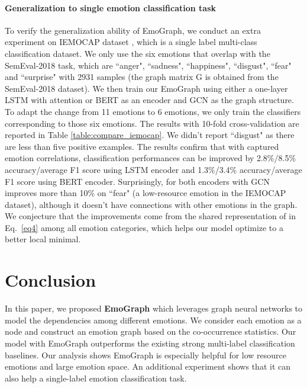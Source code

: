 \documentclass[11pt,a4paper]{article}
\begin{document}
\paragraph{Generalization to single emotion classification task}
To verify the generalization ability of EmoGraph, we conduct an extra experiment on IEMOCAP dataset \cite{busso2008iemocap}, which is a single label multi-class classification dataset. We only use the six emotions that overlap with the SemEval-2018 task, which are ``anger", ``sadness", ``happiness", ``disgust", ``fear" and ``surprise" with 2931 samples (the graph matrix G is obtained from the SemEval-2018 dataset). We then train our EmoGraph using either a one-layer LSTM with attention or BERT as an encoder and GCN as the graph structure. To adapt the change from 11 emotions to 6 emotions, we only train the classifiers  corresponding to those six emotions. 
The results with 10-fold cross-validation are reported in Table \ref{table:compare_iemocap}. We didn't report ``disgust" as there are less than five positive examples. The results confirm that with captured emotion correlations, classification performances can be improved by 2.8\%/8.5\% accuracy/average F1 score using LSTM encoder and 1.3\%/3.4\% accuracy/average F1 score using BERT encoder. Surprisingly, for both encoders with GCN improves more than 10\% on ``fear" (a low-resource emotion in the IEMOCAP dataset), although it doesn't have connections with other emotions in the graph. We conjecture that the improvements come from the shared representation of  in Eq.~\ref{eq4} among all emotion categories, which helps our model optimize to a better local minimal.





























\section{Conclusion}
In this paper, we proposed \textbf{EmoGraph} which leverages graph neural networks to model the dependencies among different emotions. We consider each emotion as a node and construct an emotion graph based on the co-occurrence statistics.
Our model with EmoGraph outperforms the existing strong multi-label classification baselines. Our analysis shows EmoGraph is especially helpful for low resource emotions and large emotion space. An additional experiment shows that it can also help a single-label emotion classification task.
\end{document}
